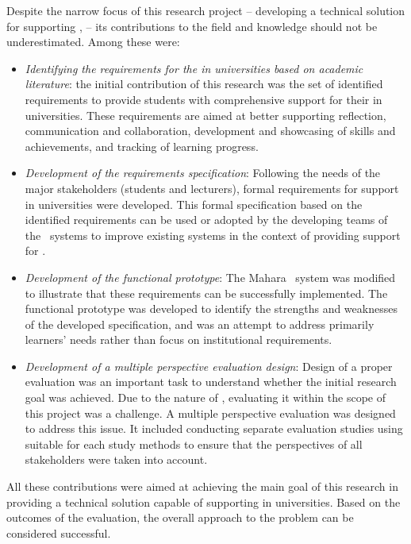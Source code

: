 Despite the narrow focus of this research project -- developing a technical
solution for supporting \LLLsn, -- its contributions to the field and knowledge
should not be underestimated. Among these were:
\begin{itemize}
  \item \textit{Identifying the requirements for the \LLLs in universities based
  on academic literature}: the initial contribution of this research was the set
  of identified requirements to provide students with comprehensive support for
  their \LLLs in universities. These requirements are aimed at better supporting
  reflection, communication and collaboration, development and showcasing of
  skills and achievements, and tracking of learning progress.
  
  \item \textit{Development of the requirements specification}: Following the
  needs of the major stakeholders (students and lecturers), formal requirements
  for \LLLs support in universities were developed. This formal specification
  based on the identified requirements can be used or adopted by the developing
  teams of the \ep~systems to improve existing systems in the context of
  providing support for \LLLsn.
  
  \item \textit{Development of the functional prototype}: The Mahara \ep~system
  was modified to illustrate that these requirements can be successfully
  implemented. The functional prototype was developed to identify the strengths
  and weaknesses of the developed specification, and was an attempt to address
  primarily learners' needs rather than focus on institutional requirements.
  
  \item \textit{Development of a multiple perspective evaluation design}: Design
  of a proper evaluation was an important task to understand whether the initial
  research goal was achieved. Due to the nature of \LLLsn, evaluating it within
  the scope of this project was a challenge. A multiple perspective evaluation
  was designed to address this issue. It included conducting separate evaluation
  studies using suitable for each study methods to ensure that the perspectives
  of all stakeholders were taken into account. 
\end{itemize}

All these contributions were aimed at achieving the main goal of this research
in providing a technical solution capable of supporting \LLLs in universities.
Based on the outcomes of the evaluation, the overall approach to the problem can
be considered successful.

